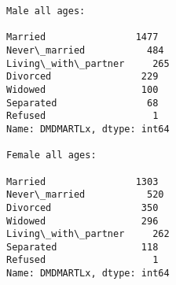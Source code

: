 \documentclass[11pt]{article}
\begin{document}
    \begin{Verbatim}[commandchars=\\\{\}]
Male all ages: 

Married                1477
Never\_married           484
Living\_with\_partner     265
Divorced                229
Widowed                 100
Separated                68
Refused                   1
Name: DMDMARTLx, dtype: int64 

Female all ages:

Married                1303
Never\_married           520
Divorced                350
Widowed                 296
Living\_with\_partner     262
Separated               118
Refused                   1
Name: DMDMARTLx, dtype: int64

    \end{Verbatim}
\end{document}
